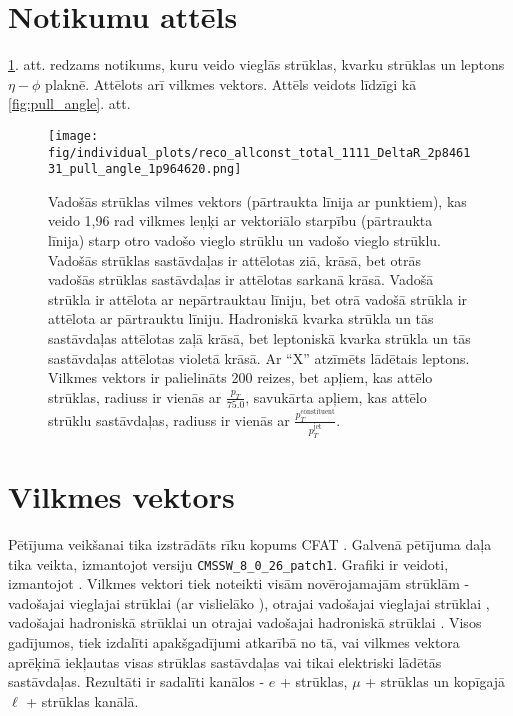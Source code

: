 \label{chap:results}
\section{Notikumu attēls}
\ref{fig:event_display}. att. redzams notikums, kuru veido vieglās strūklas, \cPqb kvarku strūklas un leptons $\eta-\phi$ plaknē. Attēlots arī vilkmes vektors. Attēls veidots līdzīgi kā \ref{fig:pull_angle}. att.

\begin{figure}[hbtp]
  \centering
  \texttt{[image: fig/individual\_plots/reco\_allconst\_total\_1111\_DeltaR\_2p846131\_pull\_angle\_1p964620.png]}
  \caption{Vadošās strūklas vilmes vektors (pārtraukta līnija ar punktiem), kas veido 1,96 rad vilkmes leņķi ar vektoriālo starpību (pārtraukta līnija) starp otro vadošo vieglo strūklu un vadošo vieglo strūklu. Vadošās strūklas sastāvdaļas ir attēlotas ziā, krāsā, bet otrās vadošās strūklas sastāvdaļas ir attēlotas sarkanā krāsā. Vadošā strūkla ir attēlota ar nepārtrauktau līniju, bet otrā vadošā strūkla ir attēlota ar pārtrauktu līniju. Hadroniskā \cPqb kvarka strūkla un tās sastāvdaļas attēlotas zaļā krāsā, bet leptoniskā \cPqb kvarka strūkla un tās sastāvdaļas attēlotas violetā krāsā. Ar ``X'' atzīmēts lādētais leptons. Vilkmes vektors ir palielināts 200 reizes, bet apļiem, kas attēlo strūklas, radiuss ir vienās ar $\frac{p_{T}}{75.0}$, savukārta apļiem, kas attēlo strūklu sastāvdaļas, radiuss ir vienās ar $\frac{p^{\text{constituent}}_{T}}{p^{\text{jet}}_{T}}$.}
  \label{fig:event_display}
\end{figure}

\section{Vilkmes vektors}

Pētījuma veikšanai tika izstrādāts rīku kopums \textsc{CFAT} \cite{url:cfat}. Galvenā pētījuma daļa tika veikta, izmantojot \CMSSW versiju \lstinline[language=sh]|CMSSW_8_0_26_patch1|. Grafiki ir veidoti, izmantojot \ROOT \cite{Brun}. Vilkmes vektori tiek noteikti visām novērojamajām strūklām - vadošajai vieglajai strūklai \leadingjet (ar vislielāko \pt), otrajai vadošajai vieglajai strūklai \scndleadingjet, vadošajai hadroniskā \cPqb strūklai \leadingb un otrajai vadošajai hadroniskā \cPqb strūklai \scndleadingb. Visos gadījumos, tiek izdalīti apakšgadījumi atkarībā no tā, vai vilkmes vektora aprēķinā iekļautas visas strūklas sastāvdaļas vai tikai elektriski lādētās sastāvdaļas. Rezultāti ir sadalīti kanālos - $e$ + strūklas, $\mu$ + strūklas un kopīgajā $\ell$ + strūklas kanālā.

